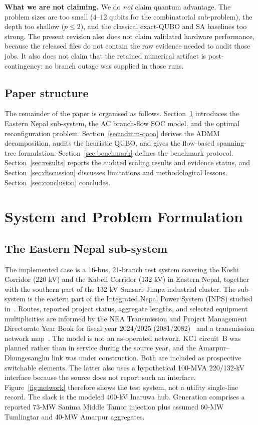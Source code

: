 \documentclass[5p,twocolumn,number,sort&compress,nopreprintline]{elsarticle}
\begin{document}
\textbf{What we are not claiming.} We do \emph{not} claim quantum
advantage. The problem sizes are too small (4--12 qubits for the
combinatorial sub-problem), the depth too shallow ($p\le 2$), and the
classical exact-QUBO and SA baselines too strong. The present revision also
does not claim validated hardware performance, because the released
files do not contain the raw evidence needed to audit those jobs. It
also does not claim that the retained numerical
artifact is post-contingency: no branch outage was supplied in those runs.

\subsection{Paper structure}
The remainder of the paper is organised as follows.
Section~\ref{sec:system} introduces the Eastern Nepal sub-system, the
AC branch-flow SOC model, and the optimal reconfiguration problem.
Section~\ref{sec:admm-qaoa} derives the ADMM decomposition, audits the
heuristic QUBO, and gives the flow-based spanning-tree formulation.
Section~\ref{sec:benchmark} defines the
benchmark protocol. Section~\ref{sec:results} reports the audited
scaling results and evidence status, and Section~\ref{sec:discussion} discusses
limitations and methodological lessons. Section~\ref{sec:conclusion}
concludes.

\section{System and Problem Formulation}
\label{sec:system}

\subsection{The Eastern Nepal sub-system}
\label{sec:system-data}
The implemented case is a 16-bus, 21-branch test system covering the Koshi
Corridor (220 kV) and the Kabeli Corridor (132 kV) in Eastern Nepal,
together with the southern part of the 132 kV Sunsari--Jhapa industrial
cluster. The sub-system is the eastern part of the Integrated Nepal
Power System (INPS) studied in~\cite{bhandari2020inps,shah2023hditl}.
Routes, reported project status, aggregate lengths, and selected
equipment multiplicities are informed by the NEA Transmission and
Project Management Directorate Year Book for fiscal year 2024/2025
(2081/2082)~\cite{nea2082yearbook} and a transmission network
map~\cite{nea_transmission_map}. The model is not an as-operated
network. KC1 circuit~B was planned rather than in service during the
source year, and the Amarpur--Dhungesanghu link was under construction.
Both are included as prospective switchable elements. The latter also
uses a hypothetical 100-MVA 220/132-kV interface because the source
does not report such an interface. Figure~\ref{fig:network} therefore
shows the test system, not a utility single-line record. The slack is
the modeled 400-kV Inaruwa hub. Generation comprises a reported
73-MW Sanima Middle Tamor injection plus assumed 60-MW Tumlingtar and
40-MW Amarpur aggregates.
\end{document}
